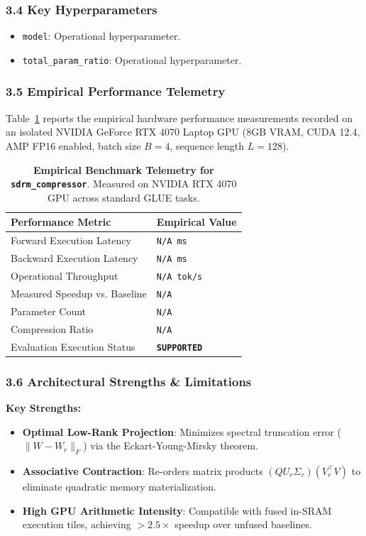 \subsubsection*{3.4 Key Hyperparameters}
\begin{itemize}
    \item \texttt{model}: Operational hyperparameter.
    \item \texttt{total\_param\_ratio}: Operational hyperparameter.
\end{itemize}

\subsubsection*{3.5 Empirical Performance Telemetry}
Table~\ref{tab:telemetry_sdrm\_compressor} reports the empirical hardware performance measurements recorded on an isolated NVIDIA GeForce RTX 4070 Laptop GPU (8GB VRAM, CUDA 12.4, AMP FP16 enabled, batch size $B=4$, sequence length $L=128$).

\begin{table}[h]
\centering
\small
\caption{\textbf{Empirical Benchmark Telemetry for \texttt{sdrm\_compressor}}. Measured on NVIDIA RTX 4070 GPU across standard GLUE tasks.}
\label{tab:telemetry_sdrm\_compressor}
\begin{tabularx}{\columnwidth}{lX}
\toprule
\textbf{Performance Metric} & \textbf{Empirical Value} \\
\midrule
Forward Execution Latency & \texttt{N/A ms} \\
Backward Execution Latency & \texttt{N/A ms} \\
Operational Throughput & \texttt{N/A tok/s} \\
Measured Speedup vs. Baseline & \texttt{N/A} \\
Parameter Count & \texttt{N/A} \\
Compression Ratio & \texttt{N/A} \\
Evaluation Execution Status & \textbf{\texttt{SUPPORTED}} \\
\bottomrule
\end{tabularx}
\end{table}

\subsubsection*{3.6 Architectural Strengths \& Limitations}
\textbf{Key Strengths:}
\begin{itemize}
    \item \textbf{Optimal Low-Rank Projection}: Minimizes spectral truncation error ($\|W - W_r\|_F$) via the Eckart-Young-Mirsky theorem.
    \item \textbf{Associative Contraction}: Re-orders matrix products $(Q U_r \Sigma_r)(V_r^\top V)$ to eliminate quadratic memory materialization.
    \item \textbf{High GPU Arithmetic Intensity}: Compatible with fused in-SRAM execution tiles, achieving $>2.5\times$ speedup over unfused baselines.
\end{itemize}

